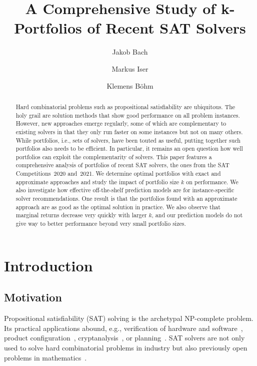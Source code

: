 \documentclass[a4paper,USenglish,pdfa]{lipics-v2021} %
\title{A Comprehensive Study of k-Portfolios of Recent SAT Solvers}
\author{Jakob Bach}{Karlsruhe Institute of Technology (KIT), Germany}{jakob.bach@kit.edu}{https://orcid.org/0000-0003-0301-2798}{}
\author{Markus Iser}{Karlsruhe Institute of Technology (KIT), Germany}{markus.iser@kit.edu}{https://orcid.org/0000-0003-2904-232X}{}
\author{Klemens Böhm}{Karlsruhe Institute of Technology (KIT), Germany}{klemens.boehm@kit.edu}{}{}
\begin{document}
\maketitle

\begin{abstract}
Hard combinatorial problems such as propositional satisfiability are ubiquitous. 
The holy grail are solution methods that show good performance on all problem instances. 
However, new approaches emerge regularly, some of which are complementary to existing solvers in that they only run faster on some instances but not on many others. 
While portfolios, i.e., sets of solvers, have been touted as useful, putting together such portfolios also needs to be efficient. 
In particular, it remains an open question how well portfolios can exploit the complementarity of solvers. 
This paper features a comprehensive analysis of portfolios of recent SAT solvers, the ones from the SAT Competitions~2020 and~2021. 
We determine optimal portfolios with exact and approximate approaches and study the impact of portfolio size $k$ on performance. 
We also investigate how effective off-the-shelf prediction models are for instance-specific solver recommendations.
One result is that the portfolios found with an approximate approach are as good as the optimal solution in practice. 
We also observe that marginal returns decrease very quickly with larger $k$, and our prediction models do not give way to better performance beyond very small portfolio sizes. 
\end{abstract}

\section{Introduction}
\label{sec:introduction}

\subsection{Motivation}

Propositional satisfiability (SAT) solving is the archetypal NP-complete problem.
Its practical applications abound, e.g., verification of hardware and software~\cite{Kaufmann:2021:Amulet,Buning:2020:QPRVerify}, product configuration~\cite{Janota:2014:Configuration}, cryptanalysis~\cite{Nejati:2020:CDCLCrypto}, or planning~\cite{Schreiber:2021:Lilotane}.
SAT solvers are not only used to solve hard combinatorial problems in industry but also previously open problems in mathematics~\cite{Heule:2016:Pyth,Heule:2018:Schur}. 
\end{document}
